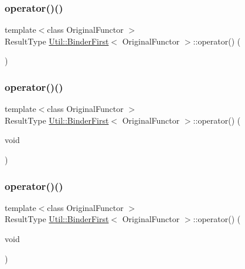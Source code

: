 \subsubsection{\texorpdfstring{operator()()}{operator()()}\hspace{0.1cm}{\footnotesize\ttfamily [1/15]}}
{\footnotesize\ttfamily template$<$class Original\+Functor $>$ \\
Result\+Type \mbox{\hyperlink{classUtil_1_1BinderFirst}{Util\+::\+Binder\+First}}$<$ Original\+Functor $>$\+::operator() (\begin{DoxyParamCaption}{ }\end{DoxyParamCaption})\hspace{0.3cm}{\ttfamily [inline]}}

\mbox{\label{classUtil_1_1BinderFirst_aaf3277caca5fced7454825a2f2920847}} 
\subsubsection{\texorpdfstring{operator()()}{operator()()}\hspace{0.1cm}{\footnotesize\ttfamily [2/15]}}
{\footnotesize\ttfamily template$<$class Original\+Functor $>$ \\
Result\+Type \mbox{\hyperlink{classUtil_1_1BinderFirst}{Util\+::\+Binder\+First}}$<$ Original\+Functor $>$\+::operator() (\begin{DoxyParamCaption}\item[{void}]{ }\end{DoxyParamCaption})\hspace{0.3cm}{\ttfamily [inline]}}

\mbox{\label{classUtil_1_1BinderFirst_aaf3277caca5fced7454825a2f2920847}} 
\subsubsection{\texorpdfstring{operator()()}{operator()()}\hspace{0.1cm}{\footnotesize\ttfamily [3/15]}}
{\footnotesize\ttfamily template$<$class Original\+Functor $>$ \\
Result\+Type \mbox{\hyperlink{classUtil_1_1BinderFirst}{Util\+::\+Binder\+First}}$<$ Original\+Functor $>$\+::operator() (\begin{DoxyParamCaption}\item[{void}]{ }\end{DoxyParamCaption})\hspace{0.3cm}{\ttfamily [inline]}}

